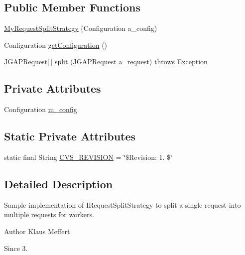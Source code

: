 \subsection*{Public Member Functions}
\begin{DoxyCompactItemize}
\item 
\hyperlink{classexamples_1_1grid_1_1fitness_distributed_1_1_my_request_split_strategy_a86bfd2067c1129b1ea4ea00ff2f92cad}{My\-Request\-Split\-Strategy} (Configuration a\-\_\-config)
\item 
Configuration \hyperlink{classexamples_1_1grid_1_1fitness_distributed_1_1_my_request_split_strategy_af508bbd4e42f0637b672be0f8377c2b2}{get\-Configuration} ()
\item 
J\-G\-A\-P\-Request\mbox{[}$\,$\mbox{]} \hyperlink{classexamples_1_1grid_1_1fitness_distributed_1_1_my_request_split_strategy_a0e7ae402e3ff4daa1391ec69fea4d6e8}{split} (J\-G\-A\-P\-Request a\-\_\-request)  throws Exception 
\end{DoxyCompactItemize}
\subsection*{Private Attributes}
\begin{DoxyCompactItemize}
\item 
Configuration \hyperlink{classexamples_1_1grid_1_1fitness_distributed_1_1_my_request_split_strategy_af99e86a7a640ecd4cf7d5048654beb67}{m\-\_\-config}
\end{DoxyCompactItemize}
\subsection*{Static Private Attributes}
\begin{DoxyCompactItemize}
\item 
static final String \hyperlink{classexamples_1_1grid_1_1fitness_distributed_1_1_my_request_split_strategy_a9f28bdbae159523bc23cb0f3a3de981c}{C\-V\-S\-\_\-\-R\-E\-V\-I\-S\-I\-O\-N} = \char`\"{}\$Revision\-: 1. \$\char`\"{}
\end{DoxyCompactItemize}


\subsection{Detailed Description}
Sample implementation of I\-Request\-Split\-Strategy to split a single request into multiple requests for workers.

\begin{DoxyAuthor}{Author}
Klaus Meffert 
\end{DoxyAuthor}
\begin{DoxySince}{Since}
3. 
\end{DoxySince}


